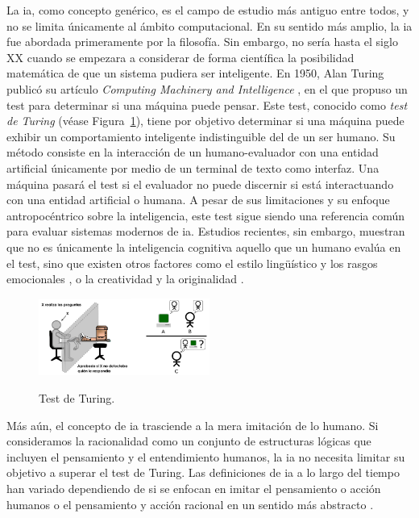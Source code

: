 La \gls{ia}, como concepto genérico, es el campo de estudio más antiguo entre todos, y no se limita únicamente al ámbito computacional. En su sentido más amplio, la \gls{ia} fue abordada primeramente por la filosofía. 
Sin embargo, no sería hasta el siglo XX cuando se empezara a considerar de forma científica la posibilidad matemática de que un sistema pudiera ser inteligente. En 1950, Alan Turing publicó su artículo \emph{Computing Machinery and Intelligence} \citep{alan1950a}, en el que propuso un test para determinar si una máquina puede pensar. Este test, conocido como \emph{test de Turing} (véase Figura~\ref{fig:test_turing}), tiene por objetivo determinar si una máquina puede exhibir un comportamiento inteligente indistinguible del de un ser humano. Su método consiste en la interacción de un humano-evaluador con una entidad artificial únicamente por medio de un terminal de texto como interfaz. Una máquina pasará el test si el evaluador no puede discernir si está interactuando con una entidad artificial o humana. A pesar de sus limitaciones y su enfoque antropocéntrico sobre la inteligencia, este test sigue siendo una referencia común para evaluar sistemas modernos de \gls{ia}. Estudios recientes, sin embargo, muestran que no es únicamente la inteligencia cognitiva aquello que un humano evalúa en el test, sino que existen otros factores como el estilo lingüístico y los rasgos emocionales \citep{jonesDoesGPT4Pass2023}, o la creatividad y la originalidad \citep{noeverTuringDeception2022}.

\begin{figure}[H]
    \caption[Test de Turing]{Test de Turing.}
    \centering
    \includegraphics[width=0.5\textwidth]{./figuras/test_turing.png}
    \label{fig:test_turing}
\end{figure}

Más aún, el concepto de \gls{ia} trasciende a la mera imitación de lo humano. Si consideramos la racionalidad como un conjunto de estructuras lógicas que incluyen el pensamiento y el entendimiento humanos, la \gls{ia} no necesita limitar su objetivo a superar el test de Turing. Las definiciones de \gls{ia} a lo largo del tiempo han variado dependiendo de si se enfocan en imitar el pensamiento o acción humanos o el pensamiento y acción racional en un sentido más abstracto \citep{RussellStuartJ2021AI:A}.

